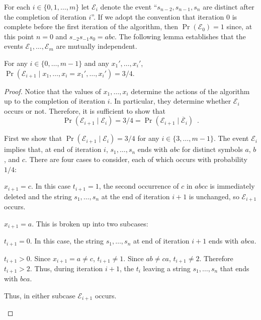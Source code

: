 \documentclass{patmorin}
\begin{document}
For each $i\in\{0,1,\ldots,m\}$ let $\mathcal{E}_i$ denote the event ``$s_{n-2},s_{n-1},s_n$ are distinct after the completion of iteration $i$''. 
If we adopt the convention that iteration 0 is complete before the first iteration of the algorithm, then $\Pr(\mathcal{E}_0)=1$ since, at this point $n=0$ and $s_{-2}s_{-1}s_{0}=abc$. The following lemma establishes that the events $\mathcal{E}_1,\ldots,\mathcal{E}_m$ are mutually independent.

\begin{lem}
  For any $i\in\{0,\ldots,m-1\}$ and any $x_1',\ldots,x_{i}'$,
  $\Pr(\mathcal{E}_{i+1}\mid x_1,\ldots,x_{i}=x_1',\ldots,x_i') = 3/4$.
\end{lem} 

\begin{proof}
  Notice that the values of $x_1,\ldots,x_i$ determine the actions of the algorithm up to the completion of iteration $i$.  In particular, they determine whether $\mathcal{E}_i$ occurs or not.  Therefore, it is sufficient to show that
  \[  \Pr(\mathcal{E}_{i+1}\mid \mathcal{E}_i) = 3/4 = \Pr(\mathcal{E}_{i+1}\mid \overline{\mathcal{E}}_i) \enspace .
  \]
  
  First we show that $\Pr(\mathcal{E}_{i+1}\mid \mathcal{E}_{i})=3/4$ for any $i\in\{3,\ldots,m-1\}$.  The event $\mathcal{E}_i$ implies that, at end of iteration $i$, $s_1,\ldots,s_n$ ends with $abc$ for distinct symbols $a$, $b$, and $c$.  There are four cases to consider, each of which occurs with probability $1/4$:
  \begin{compactenum}
    \item $x_{i+1}=c$.  In this case $t_{i+1}=1$, the second occurrence of $c$ in $abcc$ is immediately deleted and the string $s_1,\ldots,s_n$ at the end of iteration $i+1$ is unchanged, so $\mathcal{E}_{i+1}$ occurs.
    
    \item $x_{i+1}=a$.  This is broken up into two subcases:
    \begin{compactenum}
      \item $t_{i+1}=0$.  In this case, the string $s_1,\ldots,s_n$ at end of iteration $i+1$ ends with $abca$.
      \item $t_{i+1}>0$.  Since $x_{i+1}=a\neq c$, $t_{i+1}\neq 1$.  Since $ab\neq ca$, $t_{i+1}\neq 2$.  Therefore $t_{i+1}>2$.  Thus, during iteration $i+1$, the $t_{i}$ leaving a string $s_1,\ldots,s_n$ that ends with $bca$.
    \end{compactenum}
    Thus, in either subcase $\mathcal{E}_{i+1}$ occurs.
    

\end{compactenum}
\end{proof}
\end{document}
